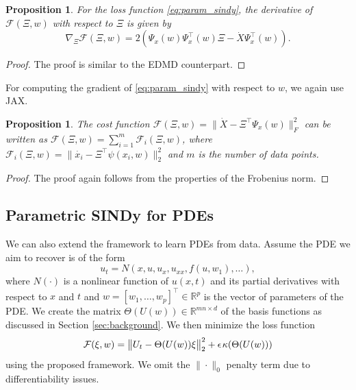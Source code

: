 \documentclass
[
    a4paper,
    DIV=11,
    abstract=true,
    11pt,
]
{scrartcl}
\newcommand{\R}{\mathbb{R}}                                      %
\newcommand{\ts}{\hspace*{0.1em}}                                %
\newtheorem{proposition}[theorem]{Proposition}
\theoremstyle{definition}
\begin{document}
\begin{proposition}
For the loss function \eqref{eq:param_sindy}, the derivative of $\mathcal{F}(\Xi, w)$ with respect to $ \Xi $ is given by
\begin{equation*}
    \nabla_{\Xi} \mathcal{F}(\Xi, w) = 2(\Psi_x(w) \Psi_x^{\top}(w) \Xi - \dot{X} \Psi_x^{\top}(w)).
\end{equation*}
\end{proposition}
\begin{proof}
The proof is similar to the EDMD counterpart.
\end{proof}

For computing the gradient of \eqref{eq:param_sindy} with respect to $w$, we again use JAX.

\begin{proposition}
The cost function $\mathcal{F}(\Xi, w) = \big\|\dot{X} - \Xi^{\top}\Psi_x(w)\big\|_F^2$ can be written as $\mathcal{F}(\Xi, w) = \sum_{i=1}^m \mathcal{F}_i(\Xi, w)$, where $\mathcal{F}_i(\Xi, w) = \big\|\dot{x_i} - \Xi^{\top} \psi(x_i, w)\big\|_2^2$ and $m$ is the number of data points.
\end{proposition}

\begin{proof}
The proof again follows from the properties of the Frobenius norm.
\end{proof}

\subsection{Parametric SINDy for PDEs}

We can also extend the framework to learn PDEs from data. Assume the PDE we aim to recover is of the form
\begin{equation*}
    u_t = N(x, u, u_x, u_{xx}, f(u, w_1), \dots),
\end{equation*}
where $N(\cdot)$ is a nonlinear function of $u(x,t)$ and its partial derivatives with respect to $x$ and $t$ and $w = [w_1, \ldots, w_p]^{\top} \in \R^p$ is the vector of parameters of the PDE. We create the matrix $\Theta(U(w)) \in \R^{mn \times d}$ of the basis functions as discussed in Section \ref{sec:background}. We then minimize the loss function
\begin{equation} \label{eq:param_pde_loss}
    \mathcal{F}(\xi, w) =  \big\|U_t - \Theta(U(w))\xi\big\|_2^2 + \epsilon \ts \kappa(\Theta(U(w)))
\end{equation}
using the proposed framework. We omit the $\| \cdot \|_0$ penalty term due to differentiability issues.
\end{document}
